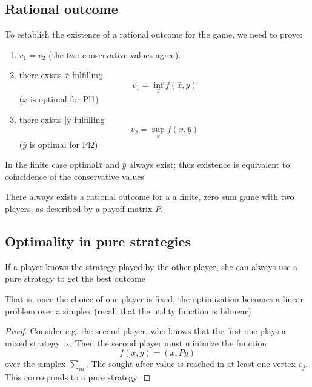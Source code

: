 \subsection{Rational outcome}

To establish the existence of a rational outcome for the game, we need to prove:
\begin{enumerate}
    \item $v_1 = v_2$ (the two conservative values agree). 
    \item there exists $\bar{x}$ fulfilling
        \[v_1 = \inf_y f (\bar{x}, y)\]
        ($\bar{x}$ is optimal for Pl1)
    \item there exists \bar{y} fulfilling
        \[v_2 = \sup_x f (x, \bar{y})\]
        ($\bar{y}$ is optimal for Pl2)
\end{enumerate}
In the finite case optimal$ \bar{x}$ and $\bar{y}$ always exist; thus existence is equivalent to coincidence of the conservative values

\begin{theorem}
    There always exists a rational outcome for a a finite, zero sum game with two players, as described by a payoff matrix $P$.
\end{theorem}

\subsection{Optimality in pure strategies}

\begin{theorem}
    If a player knows the strategy played by the other player, she can always use a pure strategy to get the best outcome
\end{theorem}
That is, once the choice of one player is fixed, the optimization becomes a linear problem over a simplex (recall that the utility function is bilinear)
\begin{proof}
    Consider e.g. the second player, who knows that the first one plays a mixed strategy \bar{x}. 
    Then the second player must minimize the function
    \[f (\bar{x}, y) = (\bar{x}, Py)\]
    over the simplex $\sum_m$. 
    The sought-after value is reached in at least one vertex $e_j$.
    This corresponds to a pure strategy.
\end{proof}
